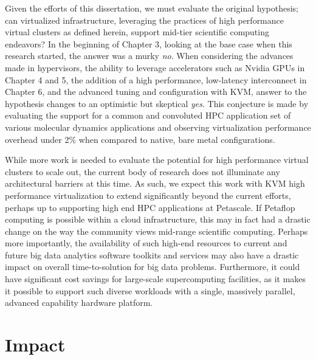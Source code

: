 Given the efforts of this dissertation, we must evaluate the original hypothesis; can virtualized infrastructure, leveraging the practices of high performance virtual clusters as defined herein, support mid-tier scientific computing endeavors? In the beginning of Chapter 3, looking at the base case when this research started, the answer was a murky \emph{no}.  When considering the advances made in hypervisors, the ability to leverage accelerators such as Nvidia GPUs in Chapter 4 and 5, the addition of a high performance, low-latency interconnect in Chapter 6, and the advanced tuning and configuration with KVM, answer to the hypothesis changes to an optimistic but skeptical \emph{yes}.  This conjecture is made by evaluating the support for a common and convoluted HPC application set of various molecular dynamics applications and observing virtualization performance overhead under 2\% when compared to native, bare metal configurations.  

While more work is needed to evaluate the potential for high performance virtual clusters to scale out, the current body of research does not illuminate any architectural barriers at this time.  As such, we expect this work with KVM high performance virtualization to extend significantly beyond the current efforts, perhaps up to supporting high end HPC applications at Petascale.  If Petaflop computing is possible within a cloud infrastructure, this may in fact had a drastic change on the way the community views mid-range scientific computing. Perhaps more importantly, the availability of such high-end resources to current and future big data analytics software toolkits and services may also have a drastic impact on overall time-to-solution for big data problems. Furthermore, it could have significant cost savings for large-scale supercomputing facilities, as it makes it possible to support such diverse workloads with a single, massively parallel, advanced capability hardware platform.  





\section{Impact}
\label{sec:impact}

